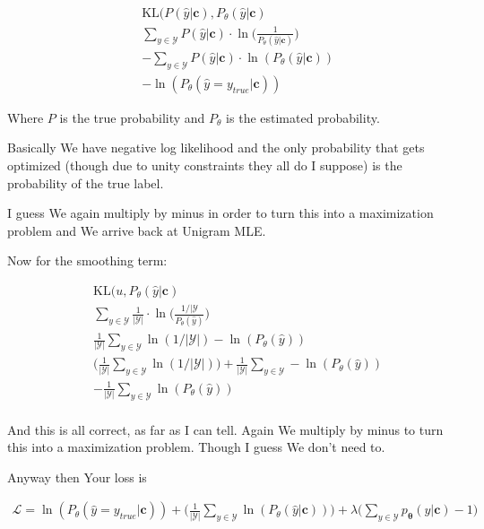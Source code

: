 \documentclass{article}
\newcommand{\KL}{\mathrm{KL}}
\newcommand{\vtheta}{\boldsymbol{\theta}}
\newcommand{\model}{p_{\vtheta}}
\newcommand{\context}{\boldsymbol{c}}
\begin{document}
		\begin{align}
			&\KL(P(\hat{y}|\context), P_\theta(\hat{y}|\context)\\
			&\sum_{y\in\mathcal{Y}} P(\hat{y}|\context )\cdot\ln\bigg(\frac{1}{P_\theta(\hat{y}|\context)} \bigg)\\
			& - \sum_{y\in\mathcal{Y}} P(\hat{y}|\context )\cdot\ln(P_\theta(\hat{y}|\context))\\
			& -\ln(P_\theta(\hat{y} = y_{true}|\context))
		\end{align}
		
		Where $P$ is the true probability and $P_\theta$ is the estimated probability.
		
		Basically We have negative log likelihood and the only probability that gets optimized (though due to unity constraints they all do I suppose) is the probability of the true label.
		
		I guess We again multiply by minus in order to turn this into a maximization problem and We arrive back at Unigram MLE.
		
		Now for the smoothing term:
		
		\begin{align}
			& \KL(u, P_\theta(\hat{y}|\context)\\
			& \sum_{y\in\mathcal{Y}} \frac{1}{|\mathcal{Y}|} \cdot \ln\bigg(\frac{1/|\mathcal{Y}}{P_\theta(\hat{y})} \bigg)\\
			& \frac{1}{|\mathcal{Y}|} \sum_{y\in\mathcal{Y}}   \ln(1/|\mathcal{Y}|) - \ln(P_\theta(\hat{y}) )\\
			& \bigg(\frac{1}{|\mathcal{Y}|} \sum_{y\in\mathcal{Y}}   \ln(1/|\mathcal{Y}|)\bigg)  + \frac{1}{|\mathcal{Y}|} \sum_{y\in\mathcal{Y}} - \ln(P_\theta(\hat{y}) )\\
			& - \frac{1}{|\mathcal{Y}|} \sum_{y\in\mathcal{Y}} \ln(P_\theta(\hat{y}) )\\
		\end{align}
		
		And this is all correct, as far as I can tell. Again We multiply by minus to turn this into a maximization problem. Though I guess We don't need to.
		
		Anyway then Your loss is
		
		\begin{align}
			\mathcal{L} = \ln(P_\theta(\hat{y} = y_{true}|\context)) + \bigg(\frac{1}{|\mathcal{Y}|} \sum_{y\in\mathcal{Y}} \ln(P_\theta(\hat{y} | \context) )\bigg) + \lambda\bigg(\sum_{y\in\mathcal{Y}}\model(y|\context) - 1 \bigg)
		\end{align}
		
\end{document}
